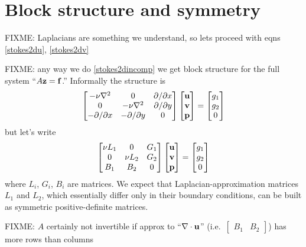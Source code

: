\section{Block structure and symmetry}

FIXME: Laplacians are something we understand, so lets proceed with eqns \eqref{stokes2du}, \eqref{stokes2dv}

FIXME: any way we do \eqref{stokes2dincomp} we get block structure for the full system ``$A \mathbf{z} = \mathbf{f}$.''  Informally the structure is
  $$\begin{bmatrix}
    -\nu\nabla^2 & 0 & \partial/\partial x \\
    0 & -\nu\nabla^2 & \partial/\partial y \\
    -\partial/\partial x & -\partial/\partial y & 0
    \end{bmatrix}
    \begin{bmatrix}
    \mathbf{u} \\ \mathbf{v} \\ \mathbf{p}
    \end{bmatrix}
    =
    \begin{bmatrix}
    g_1 \\ g_2 \\ 0
    \end{bmatrix}
    $$
but let's write
  $$\begin{bmatrix}
    \nu L_1 & 0 & G_1 \\
    0 & \nu L_2 & G_2 \\
    B_1 & B_2 & 0
    \end{bmatrix}
    \begin{bmatrix}
    \mathbf{u} \\ \mathbf{v} \\ \mathbf{p}
    \end{bmatrix}
    =
    \begin{bmatrix}
    g_1 \\ g_2 \\ 0
    \end{bmatrix}
    $$
where $L_i$, $G_i$, $B_i$ are matrices.  We expect that Laplacian-approximation matrices $L_1$ and $L_2$, which essentially differ only in their boundary conditions, can be built as symmetric positive-definite matrices.

FIXME: $A$ certainly not invertible if approx to ``$\nabla\cdot \mathbf{u}$'' (i.e.~$\begin{bmatrix} B_1 & B_2 \end{bmatrix}$) has more rows than columns

